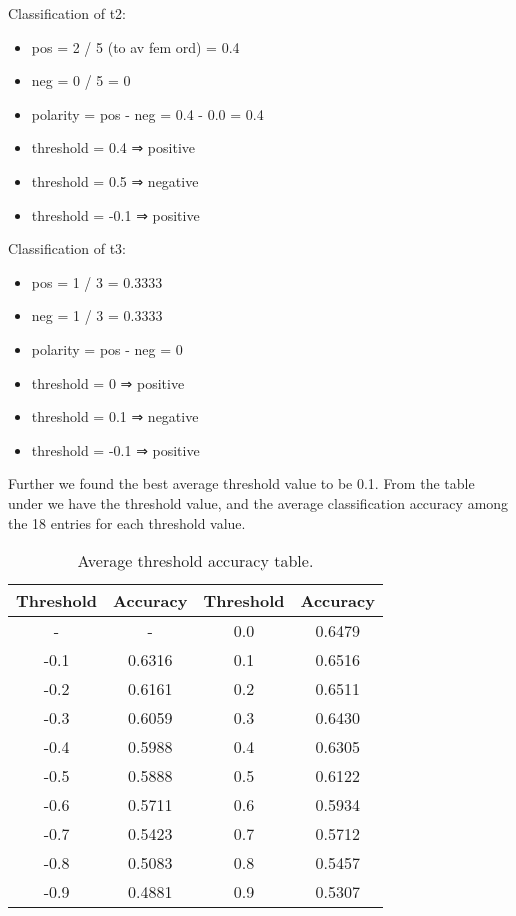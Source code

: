 Classification of t2:
\begin{itemize}
    \item pos = 2 / 5 (to av fem ord) = 0.4
    \item neg = 0 / 5 = 0
    \item polarity = pos - neg = 0.4 - 0.0 = 0.4
    \item threshold = 0.4 ⇒ positive
    \item threshold = 0.5 ⇒ negative
    \item threshold = -0.1 ⇒ positive
\end{itemize}

Classification of t3:
\begin{itemize}
    \item pos = 1 / 3 = 0.3333
    \item neg = 1 / 3 = 0.3333
    \item polarity = pos - neg = 0
    \item threshold = 0 ⇒ positive
    \item threshold = 0.1 ⇒ negative
    \item threshold = -0.1 ⇒ positive
\end{itemize}

Further we found the best average threshold value to be 0.1.
From the table under we have the threshold value, and the average
classification accuracy among the 18 entries for each threshold value. 

\begin{table}
\centering
\label{tbl:average_threshold_accuracy}
\caption{Average threshold accuracy table.}
\begin{tabular}{ c c c c }
Threshold & Accuracy & Threshold & Accuracy \\
\hline
- & - & 0.0 & 0.6479 \\
-0.1 & 0.6316 & 0.1 & 0.6516 \\
-0.2 & 0.6161 & 0.2 & 0.6511 \\
-0.3 & 0.6059 & 0.3 & 0.6430 \\
-0.4 & 0.5988 & 0.4 & 0.6305 \\
-0.5 & 0.5888 & 0.5 & 0.6122 \\
-0.6 & 0.5711 & 0.6 & 0.5934 \\
-0.7 & 0.5423 & 0.7 & 0.5712 \\
-0.8 & 0.5083 & 0.8 & 0.5457 \\
-0.9 & 0.4881 & 0.9 & 0.5307 \\
\end{tabular}
\end{table}

